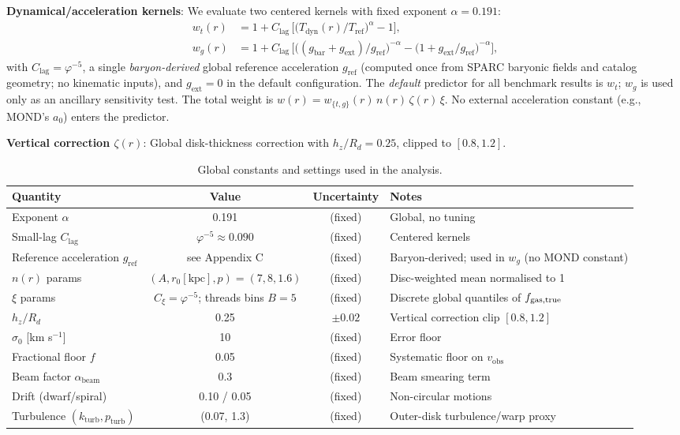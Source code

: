 \documentclass[usenatbib]{mnras}
\begin{document}
\textbf{Dynamical/acceleration kernels}: We evaluate two centered kernels with fixed exponent $\alpha = 0.191$:
\begin{align}
w_t(r) &= 1 + C_\mathrm{lag}\,\Big[\big(T_\mathrm{dyn}(r)/T_\mathrm{ref}\big)^{\alpha} - 1\Big],\\
w_g(r) &= 1 + C_\mathrm{lag}\,\Big[\big((g_\mathrm{bar}+g_\mathrm{ext})/g_\mathrm{ref}\big)^{-\alpha} - \big(1+g_\mathrm{ext}/g_\mathrm{ref}\big)^{-\alpha}\Big],
\end{align}
with $C_\mathrm{lag} = \varphi^{-5}$, a single \emph{baryon-derived} global reference acceleration $g_\mathrm{ref}$ (computed once from SPARC baryonic fields and catalog geometry; no kinematic inputs), and $g_\mathrm{ext}=0$ in the default configuration. The \emph{default} predictor for all benchmark results is $w_t$; $w_g$ is used only as an ancillary sensitivity test. The total weight is $w(r) = w_{\{t,g\}}(r)\, n(r)\,\zeta(r)\,\xi$. No external acceleration constant (e.g., MOND's $a_0$) enters the predictor.

\textbf{Vertical correction $\zeta(r)$}: Global disk-thickness correction with $h_z/R_d = 0.25$, clipped to $[0.8, 1.2]$.

\begin{table*}
\centering
\small
\setlength{\tabcolsep}{6pt}
\caption{Global constants and settings used in the analysis.}
\label{tab:parameters}
\begin{tabularx}{0.97\textwidth}{l c c >{\raggedright\arraybackslash}X}
\toprule
Quantity & Value & Uncertainty & Notes \\
\midrule
Exponent $\alpha$ & 0.191 & (fixed) & Global, no tuning \\
Small-lag $C_\mathrm{lag}$ & $\varphi^{-5} \approx 0.090$ & (fixed) & Centered kernels \\
Reference acceleration $g_\mathrm{ref}$ & see Appendix C & (fixed) & Baryon-derived; used in $w_g$ (no MOND constant) \\
$n(r)$ params & $(A, r_0[\mathrm{kpc}], p)=(7,8,1.6)$ & (fixed) & Disc-weighted mean normalised to 1 \\
$\xi$ params & $C_\xi=\varphi^{-5}$; threads bins $B{=}5$ & (fixed) & Discrete global quantiles of $f_{\rm gas,true}$ \\
$h_z/R_d$ & 0.25 & $\pm 0.02$ & Vertical correction clip $[0.8,1.2]$ \\
$\sigma_0$ [km s$^{-1}$] & 10 & (fixed) & Error floor \\
Fractional floor $f$ & 0.05 & (fixed) & Systematic floor on $v_\mathrm{obs}$ \\
Beam factor $\alpha_\mathrm{beam}$ & 0.3 & (fixed) & Beam smearing term \\
Drift (dwarf/spiral) & 0.10 / 0.05 & (fixed) & Non-circular motions \\
Turbulence $(k_\mathrm{turb},p_\mathrm{turb})$ & (0.07, 1.3) & (fixed) & Outer-disk turbulence/warp proxy \\
\bottomrule
\end{tabularx}
\end{table*}
\end{document}
